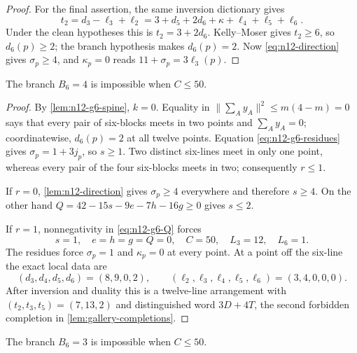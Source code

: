 \begin{proof}
For the final assertion, the same inversion dictionary gives
\[
 t_2=d_3-\ell_3+\ell_2
    =3+d_5+2d_6+\kappa+\ell_4+\ell_5+\ell_6.
\]
Under the clean hypotheses this is $t_2=3+2d_6$.  Kelly--Moser gives
$t_2\ge6$, so $d_6(p)\ge2$; the branch hypothesis makes $d_6(p)=2$.  Now
\eqref{eq:n12-direction} gives $\sigma_p\ge4$, and $\kappa_p=0$ reads
$11+\sigma_p=3\ell_3(p)$.
\end{proof}

\begin{lemma}\label{lem:n12-g6-m4}
The branch $B_6=4$ is impossible when $C\le50$.
\end{lemma}

\begin{proof}
By \cref{lem:n12-g6-spine}, $k=0$.  Equality in
$\|\sum_Ay_A\|^2\le m(4-m)=0$ says that every pair of six-blocks meets in
two points and $\sum_Ay_A=0$; coordinatewise, $d_6(p)=2$ at all twelve
points.  Equation \eqref{eq:n12-g6-residues} gives
$\sigma_p=1+3j_p$, so $s\ge1$.
Two distinct six-lines meet in only one point, whereas every pair of the
four six-blocks meets in two; consequently $r\le1$.

If $r=0$, \cref{lem:n12-direction} gives $\sigma_p\ge4$ everywhere and
therefore $s\ge4$.  On the other hand
$Q=42-15s-9e-7h-16g\ge0$ gives $s\le2$.

If $r=1$, nonnegativity in \eqref{eq:n12-g6-Q} forces
\[
s=1,\quad e=h=g=Q=0,\quad C=50,\quad L_3=12,\quad L_6=1.
\]
The residues force $\sigma_p=1$ and $\kappa_p=0$ at every point.  At a
point off the six-line the exact local data are
\[
(d_3,d_4,d_5,d_6)=(8,9,0,2),\qquad
(\ell_2,\ell_3,\ell_4,\ell_5,\ell_6)=(3,4,0,0,0).
\]
After inversion and duality this is a twelve-line arrangement with
$(t_2,t_3,t_5)=(7,13,2)$ and distinguished word $3D+4T$, the second
forbidden completion in \cref{lem:gallery-completions}.
\end{proof}

\begin{lemma}\label{lem:n12-g6-m3}
The branch $B_6=3$ is impossible when $C\le50$.
\end{lemma}

